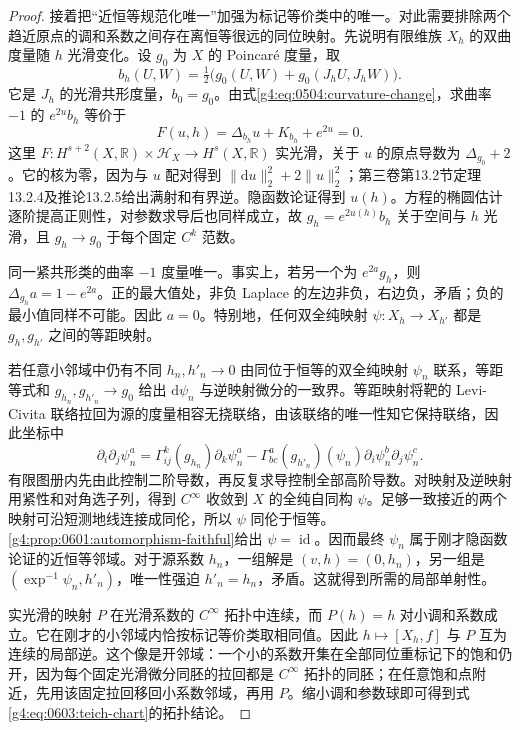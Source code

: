 \begin{proof}
	接着把“近恒等规范化唯一”加强为标记等价类中的唯一。对此需要排除两个趋近原点的调和系数之间存在离恒等很远的同位映射。先说明有限维族 \(X_h\) 的双曲度量随 \(h\) 光滑变化。设 \(g_0\) 为 \(X\) 的 Poincaré 度量，取
	\[
		b_h(U,W)=\tfrac12\bigl(g_0(U,W)+g_0(J_hU,J_hW)\bigr).
	\]
	它是 \(J_h\) 的光滑共形度量，\(b_0=g_0\)。由式\eqref{g4:eq:0504:curvature-change}，求曲率 \(-1\) 的 \(e^{2u}b_h\) 等价于
	\[
		F(u,h)=\Delta_{b_h}u+K_{b_h}+e^{2u}=0.
	\]
	这里 \(F:H^{s+2}(X,\mathbb R)\times\mathscr H_X\to H^s(X,\mathbb R)\) 实光滑，关于 \(u\) 的原点导数为 \(\Delta_{g_0}+2\)。它的核为零，因为与 \(u\) 配对得到 \(\|\mathrm{d}u\|_2^2+2\|u\|_2^2\)；第三卷第13.2节定理13.2.4及推论13.2.5给出满射和有界逆。隐函数论证得到 \(u(h)\)。方程的椭圆估计逐阶提高正则性，对参数求导后也同样成立，故 \(g_h=e^{2u(h)}b_h\) 关于空间与 \(h\) 光滑，且 \(g_h\to g_0\) 于每个固定 \(C^k\) 范数。

	同一紧共形类的曲率 \(-1\) 度量唯一。事实上，若另一个为 \(e^{2a}g_h\)，则 \(\Delta_{g_h}a=1-e^{2a}\)。正的最大值处，非负 Laplace 的左边非负，右边负，矛盾；负的最小值同样不可能。因此 \(a=0\)。特别地，任何双全纯映射 \(\psi:X_h\to X_{h'}\) 都是 \(g_h,g_{h'}\) 之间的等距映射。

	若任意小邻域中仍有不同 \(h_n,h'_n\to0\) 由同位于恒等的双全纯映射 \(\psi_n\) 联系，等距等式和 \(g_{h_n},g_{h'_n}\to g_0\) 给出 \(\mathrm{d}\psi_n\) 与逆映射微分的一致界。等距映射将靶的 Levi-Civita 联络拉回为源的度量相容无挠联络，由该联络的唯一性知它保持联络，因此坐标中
	\[
		\partial_i\partial_j\psi_n^a
		=\Gamma^k_{ij}(g_{h_n})\partial_k\psi_n^a
		-\Gamma^a_{bc}(g_{h'_n})(\psi_n)
		\partial_i\psi_n^b\partial_j\psi_n^c.
	\]
	有限图册内先由此控制二阶导数，再反复求导控制全部高阶导数。对映射及逆映射用紧性和对角选子列，得到 \(C^\infty\) 收敛到 \(X\) 的全纯自同构 \(\psi\)。足够一致接近的两个映射可沿短测地线连接成同伦，所以 \(\psi\) 同伦于恒等。\cref{g4:prop:0601:automorphism-faithful}给出 \(\psi=\operatorname{id}\)。因而最终 \(\psi_n\) 属于刚才隐函数论证的近恒等邻域。对于源系数 \(h_n\)，一组解是 \((v,h)=(0,h_n)\)，另一组是 \((\exp^{-1}\psi_n,h'_n)\)，唯一性强迫 \(h'_n=h_n\)，矛盾。这就得到所需的局部单射性。

	实光滑的映射 \(P\) 在光滑系数的 \(C^\infty\) 拓扑中连续，而 \(P(h)=h\) 对小调和系数成立。它在刚才的小邻域内恰按标记等价类取相同值。因此 \(h\mapsto[X_h,f]\) 与 \(P\) 互为连续的局部逆。这个像是开邻域：一个小的系数开集在全部同位重标记下的饱和仍开，因为每个固定光滑微分同胚的拉回都是 \(C^\infty\) 拓扑的同胚；在任意饱和点附近，先用该固定拉回移回小系数邻域，再用 \(P\)。缩小调和参数球即可得到式\eqref{g4:eq:0603:teich-chart}的拓扑结论。


\end{proof}
